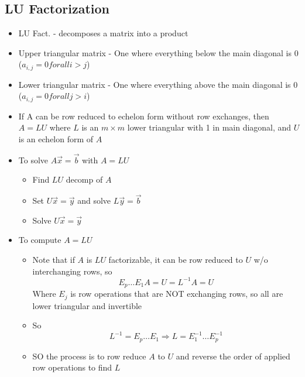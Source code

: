 \documentclass{article}
\begin{document}
\subsection{LU Factorization}
\begin{itemize}
    \item LU Fact. - decomposes a matrix into a product
    \item Upper triangular matrix - One where everything below the main diagonal is 0 (\(a_{i,j}=0 for all i>j\))
    \item Lower triangular matrix - One where everything above the main diagonal is 0 (\(a_{i,j}=0 for all j>i\))
    \item If A can be row reduced to echelon form without row exchanges, then \(A=LU\) where \(L\) is an \(m\times m\) lower triangular with 1 in main diagonal, and \(U\) is an echelon form of \(A\)
    \item To solve \(A\vec{x}=\vec{b}\) with \(A=LU\)
    \begin{itemize}
        \item Find \(LU\) decomp of \(A\) 
        \item Set \(U\vec{x}=\vec{y}\) and solve \(L\vec{y}=\vec{b}\)
        \item Solve \(U\vec{x}=\vec{y}\)
    \end{itemize}
    \item To compute \(A=LU\)
    \begin{itemize}
        \item Note that if \(A\) is \(LU\) factorizable, it can be row reduced to \(U\) w/o interchanging rows, so 
        \[E_p\dots E_1A=U=L^{-1}A=U\]
        Where \(E_j\) is row operations that are NOT exchanging rows, so all are lower triangular and invertible 
        \item So \[L^{-1}=E_p\dots E_1\Rightarrow L=E_1^{-1}\dots E_p^{-1}\]
        \item SO the process is to row reduce \(A\) to \(U\) and reverse the order of applied row operations to find \(L\)
    \end{itemize}
\end{itemize}
\end{document}
